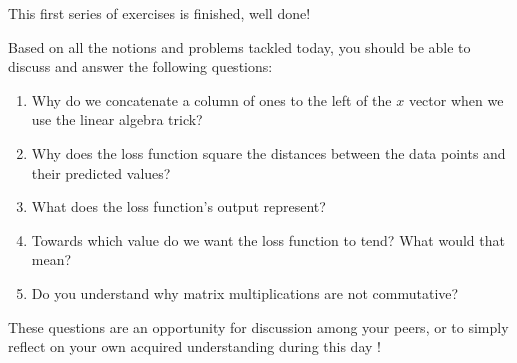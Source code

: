 \documentclass{42-en}
\begin{document}
This first series of exercises is finished, well done!

Based on all the notions and problems tackled today, you should be able to discuss and answer the following questions:
\begin{enumerate}
  \item Why do we concatenate a column of ones to the left of the $x$ vector when we use the linear algebra trick?   
  
  \item Why does the loss function square the distances between the data points and their predicted values?
  
  \item What does the loss function's output represent?
  
  \item Towards which value do we want the loss function to tend? What would that mean? 
  
  \item Do you understand why matrix multiplications are not commutative?
\end{enumerate}

These questions are an opportunity for discussion among your peers, or to simply reflect on your own acquired understanding during this day !\\
\newline
{}

\newpage


\end{document}
